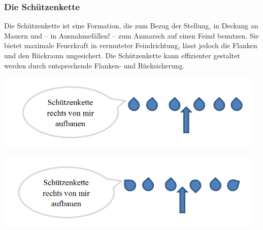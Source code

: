 \subsubsection{Die Schützenkette}
Die Schützenkette ist eine Formation, die zum Bezug der Stellung, in Deckung an Mauern und -- in Ausnahmefällen! -- zum Anmarsch auf einen Feind benutzen. Sie bietet maximale Feuerkraft in vermuteter Feindrichtung, lässt jedoch die Flanken und den Rückraum ungesichert. Die Schützenkette kann effizienter gestaltet werden durch entsprechende Flanken- und Rücksicherung.\\
\begin{minipage}[t]{1\textwidth}
	\includegraphics[width=13cm]{./Grafiken/Abschnitt/Schuetzenkette1.png}
\end{minipage}
\begin{minipage}[t]{1\textwidth}
	\includegraphics[width=13cm]{./Grafiken/Abschnitt/Schuetzenkette2.png}
\end{minipage}